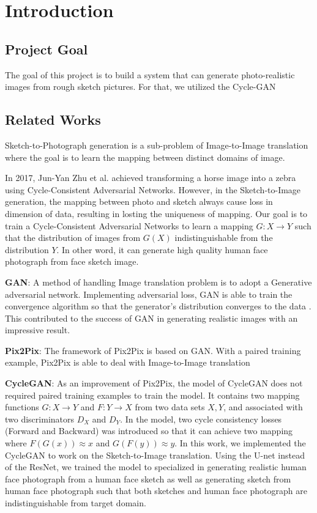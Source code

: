 \chapter{Introduction}\label{Ch:Introduction}

\section{Project Goal}

The goal of this project is to build a system that can generate photo-realistic images from rough sketch pictures. For that, we utilized the Cycle-GAN~\cite{CycleGAN} 

\section{Related Works}

Sketch-to-Photograph generation is a sub-problem of Image-to-Image translation where the goal is to learn the mapping between distinct domains of image. 

In 2017, Jun-Yan Zhu et al. achieved transforming a horse image into a zebra using Cycle-Consistent Adversarial Networks. However, in the Sketch-to-Image generation, the mapping between photo and sketch always cause loss in dimension of data, resulting in losting the uniqueness of mapping. Our goal is to train a Cycle-Consistent Adversarial Networks to learn a mapping \(G:X \rightarrow Y\) such that the distribution of images from \(G(X)\) indistinguishable from the distribution \(Y\). In other word, it can generate high quality human face photograph from face sketch image.

\textbf{GAN}: A method of handling Image translation problem is to adopt a Generative adversarial network. Implementing adversarial loss, GAN is able to train the convergence algorithm so that the generator's distribution converges to the data\cite{GANs0} . This contributed to the success of GAN in generating realistic images with an impressive result. 

\textbf{Pix2Pix}: The framework of Pix2Pix is based on GAN. With a paired training example, Pix2Pix is able to deal with Image-to-Image translation 

\textbf{CycleGAN}: As an improvement of Pix2Pix, the model of CycleGAN does not required paired training examples to train the model. It contains two mapping functions $G:X\rightarrow Y$ and $F:Y\rightarrow X$ from two data sets $X,Y$, and associated with two discriminators $D_{X}$ and $D_{Y}$. In the model, two cycle consistency losses (Forward and Backward) was introduced so that it can achieve two mapping where $F(G(x))\approx x$ and $G(F(y))\approx y$\cite{CycleGAN}. In this work, we implemented the CycleGAN to work on the Sketch-to-Image translation. Using the U-net instead of the ResNet, we trained the model to specialized in generating realistic human face photograph from a human face sketch as well as generating sketch from human face photograph such that both sketches and human face photograph are indistinguishable from target domain.

